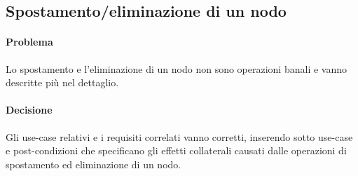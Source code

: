 \subsection{Spostamento/eliminazione di un nodo}
\paragraph{Problema}  Lo spostamento e l'eliminazione di un nodo non sono operazioni banali e vanno descritte più nel dettaglio.
\paragraph{Decisione}  Gli use-case relativi e i requisiti correlati vanno corretti, inserendo sotto use-case e post-condizioni che specificano gli effetti collaterali causati dalle operazioni di spostamento ed eliminazione di un nodo.
